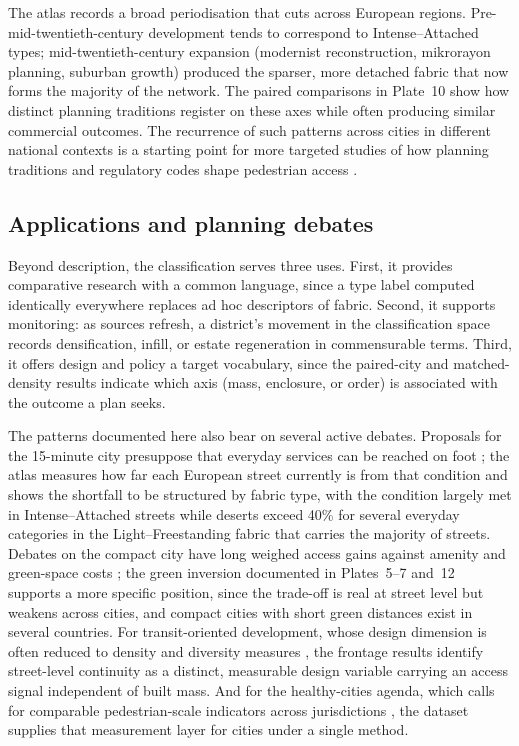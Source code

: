 \documentclass[review,authoryear]{elsarticle}
\begin{document}
The atlas records a broad periodisation that cuts across European regions. Pre-mid-twentieth-century development tends to correspond to Intense--Attached types; mid-twentieth-century expansion (modernist reconstruction, mikrorayon planning, suburban growth) produced the sparser, more detached fabric that now forms the majority of the network. The paired comparisons in Plate~10 show how distinct planning traditions register on these axes while often producing similar commercial outcomes. The recurrence of such patterns across \nCities{} cities in different national contexts is a starting point for more targeted studies of how planning traditions and regulatory codes shape pedestrian access \citep{talen2012city}.

\subsection{Applications and planning debates}

Beyond description, the classification serves three uses. First, it provides comparative research with a common language, since a type label computed identically everywhere replaces ad hoc descriptors of fabric. Second, it supports monitoring: as sources refresh, a district's movement in the classification space records densification, infill, or estate regeneration in commensurable terms. Third, it offers design and policy a target vocabulary, since the paired-city and matched-density results indicate which axis (mass, enclosure, or order) is associated with the outcome a plan seeks.

The patterns documented here also bear on several active debates. Proposals for the 15-minute city presuppose that everyday services can be reached on foot \citep{moreno2021fifteen}; the atlas measures how far each European street currently is from that condition and shows the shortfall to be structured by fabric type, with the condition largely met in Intense--Attached streets while deserts exceed 40\% for several everyday categories in the Light--Freestanding fabric that carries the majority of streets. Debates on the compact city have long weighed access gains against amenity and green-space costs \citep{neuman2005compact}; the green inversion documented in Plates~5--7 and~12 supports a more specific position, since the trade-off is real at street level but weakens across cities, and compact cities with short green distances exist in several countries. For transit-oriented development, whose design dimension is often reduced to density and diversity measures \citep{cervero1997travel}, the frontage results identify street-level continuity as a distinct, measurable design variable carrying an access signal independent of built mass. And for the healthy-cities agenda, which calls for comparable pedestrian-scale indicators across jurisdictions \citep{gilescorti2016city}, the dataset supplies that measurement layer for \nCities{} cities under a single method.
\end{document}
